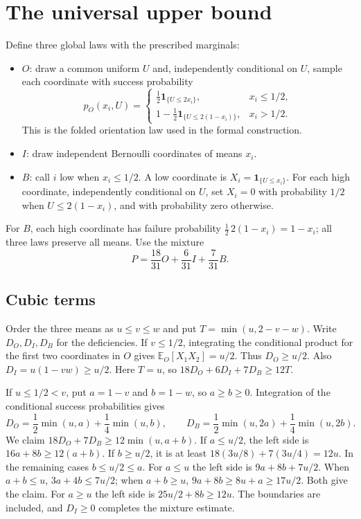 \documentclass[11pt]{article}
\theoremstyle{remark}
\newcommand{\E}{\mathbb E}
\newcommand{\ind}{\mathbf 1}
\begin{document}
\section{The universal upper bound}\label{sec:upper}
Define three global laws with the prescribed marginals:
\begin{itemize}
\item $O$: draw a common uniform $U$ and, independently conditional on
$U$, sample each coordinate with success probability
\[
 p_O(x_i,U)=
 \begin{cases}
 \tfrac12\ind_{\{U\le2x_i\}},&x_i\le1/2,\\
 1-\tfrac12\ind_{\{U\le2(1-x_i)\}},&x_i>1/2.
 \end{cases}
\]
This is the folded orientation law used in the formal construction.
\item $I$: draw independent Bernoulli coordinates of means $x_i$.
\item $B$: call $i$ low when $x_i\le1/2$. A low coordinate is
$X_i=\ind_{\{U\le x_i\}}$. For each high coordinate, independently
conditional on $U$, set $X_i=0$ with probability $1/2$ when
$U\le2(1-x_i)$, and with probability zero otherwise.
\end{itemize}
For $B$, each high coordinate has failure probability
$\tfrac12\,2(1-x_i)=1-x_i$; all three laws preserve all means.
Use the mixture
\begin{equation}\label{eq:mixture}
 P=\frac{18}{31}O+\frac6{31}I+\frac7{31}B.
\end{equation}

\subsection{Cubic terms}
Order the three means as $u\le v\le w$ and put
$T=\min(u,2-v-w)$. Write $D_O,D_I,D_B$ for the deficiencies.
If $v\le1/2$, integrating the conditional product for the first two
coordinates in $O$ gives $\E_O[X_1X_2]=u/2$. Thus $D_O\ge u/2$. Also
$D_I=u(1-vw)\ge u/2$. Here $T=u$, so
$18D_O+6D_I+7D_B\ge12T$.

If $u\le1/2<v$, put $a=1-v$ and $b=1-w$, so $a\ge b\ge0$.
Integration of the conditional success probabilities gives
\begin{equation}\label{eq:onelow}
 D_O=\frac12\min(u,a)+\frac14\min(u,b),\qquad
 D_B=\frac12\min(u,2a)+\frac14\min(u,2b).
\end{equation}
We claim $18D_O+7D_B\ge12\min(u,a+b)$. If $a\le u/2$, the left
side is $16a+8b\ge12(a+b)$. If $b\ge u/2$, it is at least
$18(3u/8)+7(3u/4)=12u$. In the remaining cases $b\le u/2\le a$.
For $a\le u$ the left side is $9a+8b+7u/2$. When $a+b\le u$,
$3a+4b\le7u/2$; when $a+b\ge u$,
$9a+8b\ge8u+a\ge17u/2$. Both give the claim. For $a\ge u$ the
left side is $25u/2+8b\ge12u$. The boundaries are included, and
$D_I\ge0$ completes the mixture estimate.
\end{document}
